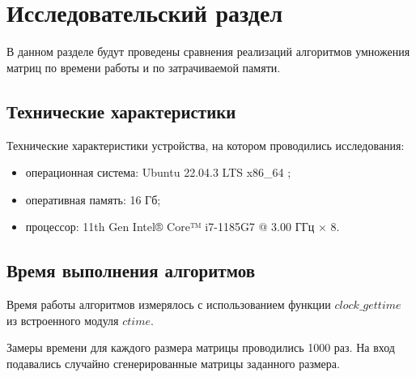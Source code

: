 \chapter{Исследовательский раздел}

В данном разделе будут проведены сравнения реализаций алгоритмов умножения матриц  по времени работы и по затрачиваемой памяти.

\section{Технические характеристики}

Технические характеристики устройства, на котором проводились исследования: 

\begin{itemize}[label=--]
	\item операционная система: Ubuntu 22.04.3 LTS x86\_64 \cite{os};
	\item оперативная память: 16 Гб;
	\item процессор: 11th Gen Intel® Core™ i7-1185G7 @ 3.00 ГГц × 8.
\end{itemize}

\section{Время выполнения алгоритмов}

Время работы алгоритмов измерялось с использованием функции $clock\_gettime$ из встроенного модуля $ctime$. 

Замеры времени для каждого размера матрицы проводились 1000 раз. На вход подавались случайно сгенерированные матрицы заданного размера. 



